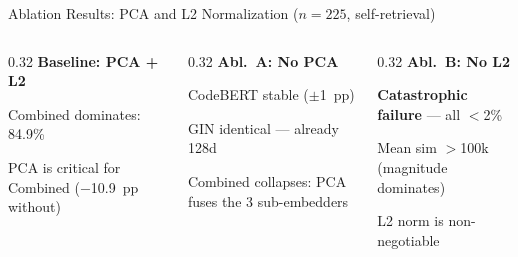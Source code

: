 \documentclass[aspectratio=169,10pt]{beamer}
\begin{document}
\begin{frame}{Ablation Results: PCA and L2 Normalization ($n{=}225$, self-retrieval)}
  \vspace{0.6em}
  \begin{columns}[T]
  \begin{column}{0.32\textwidth}
    {\small\textbf{\textcolor{hit}{Baseline: PCA + L2}}}
    \begin{itemize}\setlength{\itemsep}{2pt}
      {\scriptsize
      \item Combined dominates: 84.9\%
      \item PCA is critical for Combined ($-$10.9~pp without)}
    \end{itemize}
  \end{column}
  \begin{column}{0.32\textwidth}
    {\small\textbf{\textcolor{warn}{Abl.\ A: No PCA}}}
    \begin{itemize}\setlength{\itemsep}{2pt}
      {\scriptsize
      \item CodeBERT stable ($\pm$1~pp)
      \item GIN identical — already 128d
      \item Combined collapses: PCA fuses the 3 sub-embedders}
    \end{itemize}
  \end{column}
  \begin{column}{0.32\textwidth}
    {\small\textbf{\textcolor{miss}{Abl.\ B: No L2}}}
    \begin{itemize}\setlength{\itemsep}{2pt}
      {\scriptsize
      \item \textbf{Catastrophic failure} — all $<$2\%
      \item Mean sim $>$100k (magnitude dominates)
      \item L2 norm is non-negotiable}
    \end{itemize}
  \end{column}
  \end{columns}
\end{frame}
\end{document}
